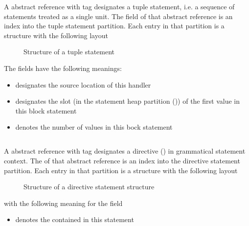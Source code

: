 A  abstract reference with tag  designates a tuple statement, i.e. a sequence of statements treated as a single unit.
The  field of that abstract reference is an index into the tuple statement partition.
Each entry in that partition is a structure with the following layout
%
\begin{figure}[H]
	\centering
	\caption{Structure of a tuple statement}
	\label{fig:ifc-tuple-stmt-structure}
\end{figure}
%
The fields have the following meanings:
\begin{itemize}
	\item {} designates the source location of this handler
	\item {} designates the slot (in the statement heap partition ()) of the first  value in this block statement
	\item {} denotes the number of  values in this bock statement 
\end{itemize}


\subsection{}
\label{sec:ifc:StmtSort:Directive}

A  abstract reference with tag  designates a directive () in grammatical statement context.
The  of that abstract reference is an index into the directive statement partition.
Each entry in that partition is a structure with the following layout
%
\begin{figure}[H]
	\centering
	\caption{Structure of a directive statement structure}
	\label{fig:ifc:StmtSort:Directive}
\end{figure}
%
with the following meaning for the field
\begin{itemize}
	\item {} denotes the  contained in this statement
\end{itemize}

